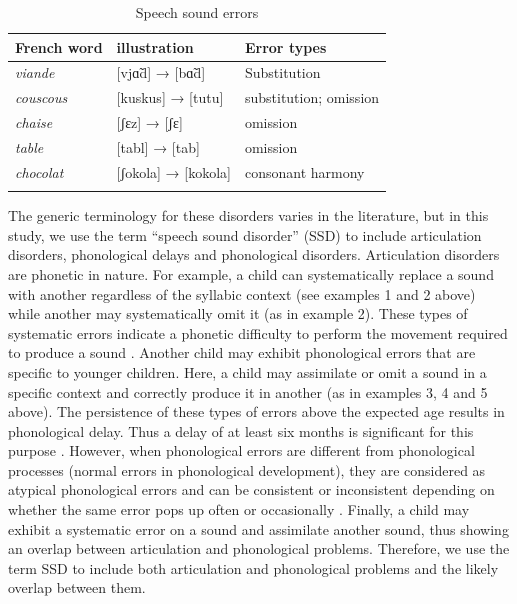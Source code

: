 \documentclass[output=paper,newtxmath,modfonts,nonflat,draftmode]{langsci/langscibook}
\begin{document}
\begin{table}
\caption{Speech sound errors\label{tab:takam:0}}
\begin{tabularx}{\textwidth}{XXX}
\lsptoprule
{French} {word}  & {illustration} & {Error} {types}\\
\midrule
\textit{viande}  & [vjɑ̃d] → [bɑ̃d] & Substitution \\
\textit{couscous}  & [kuskus] → [tutu] & substitution; omission\\
\textit{chaise}  & [ʃɛz] → [ʃɛ] & omission\\
\textit{table}  & [tabl] → [tab] & omission\\
\textit{chocolat}  & [ʃokola] → [kokola] & consonant harmony\\
\lspbottomrule
\end{tabularx}
\end{table}


The generic terminology for these disorders varies in the literature, but in this study, we use the term “speech sound disorder” (SSD) to include articulation disorders, phonological delays and phonological disorders. Articulation disorders are phonetic in nature. For example, a child can systematically replace a sound with another regardless of the syllabic context (see examples 1 and 2 above) while another may systematically omit it (as in example 2). These types of systematic errors indicate a phonetic difficulty to perform the movement required to produce a sound \citep{Fox2001}. Another child may exhibit phonological errors that are specific to younger children. Here, a child may assimilate or omit a sound in a specific context and correctly produce it in another (as in examples 3, 4 and 5 above). The persistence of these types of errors above the expected age results in phonological delay. Thus a delay of at least six months is significant for this purpose \citep{Dodd2013}. %
However, when phonological errors are different from phonological processes (normal errors in phonological development), they are considered as atypical phonological errors and can be consistent or inconsistent depending on whether the same error pops up often or occasionally \citep{Dodd2013}. Finally, a child may exhibit a systematic error on a sound and assimilate another sound, thus showing an overlap between articulation and phonological problems. Therefore, we use the term SSD to include both articulation and phonological problems and the likely overlap between them.
\end{document}
